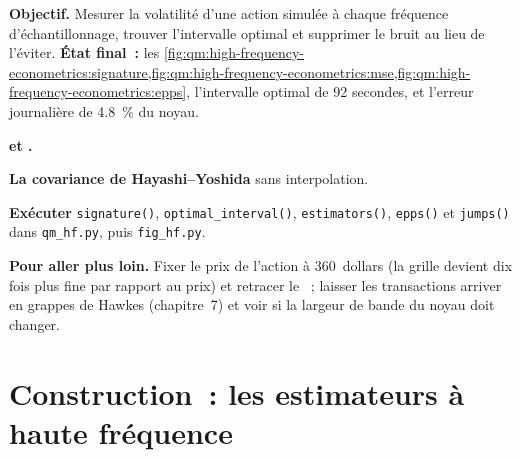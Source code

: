\begin{tutorial}
\textbf{Objectif.} Mesurer la volatilité d'une action simulée à chaque fréquence d'échantillonnage, trouver l'intervalle optimal et supprimer le bruit au lieu de l'éviter.
\textbf{État final~:} les \cref{fig:qm:high-frequency-econometrics:signature,fig:qm:high-frequency-econometrics:mse,fig:qm:high-frequency-econometrics:epps}, l'intervalle optimal de 92
secondes, et l'erreur journalière de 4.8~\% du noyau.
\begin{tutsteps}
\item \textbf{ et .}
\label{lst:qm:high-frequency-econometrics:tsrv}
\item \textbf{La covariance de Hayashi--Yoshida} sans interpolation.
\label{lst:qm:high-frequency-econometrics:hy}
\item \textbf{Exécuter} \texttt{signature()}, \texttt{optimal\_interval()}, \texttt{estimators()}, \texttt{epps()} et \texttt{jumps()} dans \texttt{qm\_hf.py}, puis
\texttt{fig\_hf.py}.
\end{tutsteps}
\textbf{Pour aller plus loin.} Fixer le prix de l'action à 360~dollars (la grille devient dix fois plus fine par rapport au prix) et retracer le ~; laisser les transactions arriver en
grappes de Hawkes (chapitre~7) et voir si la largeur de bande du noyau doit changer.
\end{tutorial}

\section{Construction~: les estimateurs à haute fréquence}\label{bld:qm:high-frequency-econometrics:hfvol}

